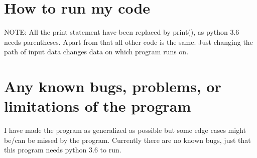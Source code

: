 \documentclass{article}
\begin{document}
\section{How to run my code}
NOTE: All the print statement have been replaced by print(),
as python 3.6 needs parentheses. Apart from that all other 
code is the same. Just changing the path of input data 
changes data on which program runs on.

\section{Any known bugs, problems, or limitations of the program}
I have made the program as generalized as possible but some
edge cases might be/can be missed by the program. Currently 
there are no known bugs, just that this program needs python 3.6 
to run.
\end{document}
